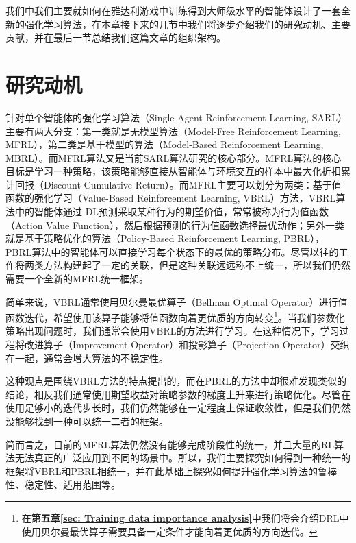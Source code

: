 我们中我们主要就如何在雅达利游戏中训练得到大师级水平的智能体设计了一套全新的强化学习算法，在本章接下来的几节中我们将逐步介绍我们的研究动机、主要贡献，并在最后一节总结我们这篇文章的组织架构。
\section{研究动机}

针对单个智能体的强化学习算法（Single Agent Reinforcement Learning, SARL）主要有两大分支：第一类就是无模型算法（Model-Free Reinforcement Learning, MFRL），第二类是基于模型的算法（Model-Based Reinforcement Learning, MBRL）。而MFRL算法又是当前SARL算法研究的核心部分。MFRL算法的核心目标是学习一种策略，该策略能够直接从智能体与环境交互的样本中最大化折扣累计回报（Discount Cumulative Return）。而MFRL主要可以划分为两类：基于值函数的强化学习（Value-Based Reinforcement Learning, VBRL）方法，VBRL算法中的智能体通过
DL预测采取某种行为的期望价值，常常被称为行为值函数（Action Value Function），然后根据预测的行为值函数选择最优动作；另外一类就是基于策略优化的算法（Policy-Based Reinforcement Learning, PBRL），PBRL算法中的智能体可以直接学习每个状态下的最优的策略分布。尽管以往的工作将两类方法构建起了一定的关联，但是这种关联远远称不上统一，所以我们仍然需要一个全新的MFRL统一框架。

简单来说，VBRL通常使用贝尔曼最优算子（Bellman Optimal Operator）进行值函数迭代，希望使用该算子能够将值函数向着更优质的方向转变\footnote{在\textbf{第五章\ref{sec: Training data importance analysis}}中我们将会介绍DRL中使用贝尔曼最优算子需要具备一定条件才能向着更优质的方向迭代。}。当我们参数化策略出现问题时，我们通常会使用VBRL的方法进行学习。在这种情况下，学习过程将改进算子（Improvement Operator）和投影算子（Projection Operator）交织在一起，通常会增大算法的不稳定性。

这种观点是围绕VBRL方法的特点提出的，而在PBRL的方法中却很难发现类似的结论，相反我们通常使用期望收益对策略参数的梯度上升来进行策略优化。尽管在使用足够小的迭代步长时，我们仍然能够在一定程度上保证收敛性，但是我们仍然没能够找到一种可以统一二者的框架。

简而言之，目前的MFRL算法仍然没有能够完成阶段性的统一，并且大量的RL算法无法真正的广泛应用到不同的场景中。所以，我们主要探究如何得到一种统一的框架将VBRL和PBRL相统一，并在此基础上探究如何提升强化学习算法的鲁棒性、稳定性、适用范围等。
